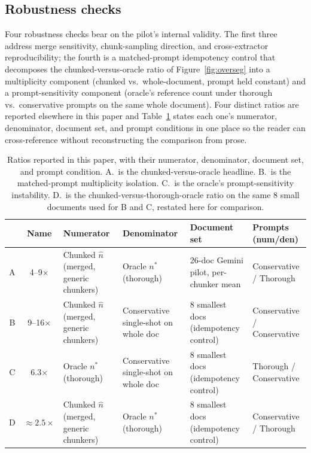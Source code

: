 \documentclass[make,article,submit,oneauthor,pdftex]{Definitions/mdpi}
\begin{document}
\subsection{Robustness checks}\label{sec:robustness}

Four robustness checks bear on the pilot's internal validity. The
first three address merge sensitivity, chunk-sampling direction, and
cross-extractor reproducibility; the fourth is a matched-prompt
idempotency control that decomposes the chunked-versus-oracle ratio
of Figure~\ref{fig:overseg} into a multiplicity component (chunked
vs.\ whole-document, prompt held constant) and a prompt-sensitivity
component (oracle's reference count under thorough vs.\ conservative
prompts on the same whole document). Four distinct ratios are reported
elsewhere in this paper and Table~\ref{tab:ratios} states each one's
numerator, denominator, document set, and prompt conditions in one
place so the reader can cross-reference without reconstructing the
comparison from prose.

\begin{table}[ht]
\centering
\caption{Ratios reported in this paper, with their numerator,
denominator, document set, and prompt condition. A.\ is the
chunked-versus-oracle headline. B.\ is the matched-prompt
multiplicity isolation. C.\ is the oracle's prompt-sensitivity
instability. D.\ is the chunked-versus-thorough-oracle ratio on the
same 8 small documents used for B and C, restated here for
comparison.}
\label{tab:ratios}
\footnotesize
\setlength{\tabcolsep}{4pt}
\begin{tabular}{c c p{2.95cm} p{2.95cm} p{3.3cm} p{2.3cm}}
\toprule
& Name & Numerator & Denominator & Document set & Prompts (num/den) \\
\midrule
A & 4--9$\times$  & Chunked $\hat{n}$ (merged, generic chunkers)
                  & Oracle $n^{*}$ (thorough)
                  & 26-doc Gemini pilot, per-chunker mean
                  & Conservative / Thorough \\
B & 9--16$\times$ & Chunked $\hat{n}$ (merged, generic chunkers)
                  & Conservative single-shot on whole doc
                  & 8 smallest docs (idempotency control)
                  & Conservative / Conservative \\
C & 6.3$\times$   & Oracle $n^{*}$ (thorough)
                  & Conservative single-shot on whole doc
                  & 8 smallest docs (idempotency control)
                  & Thorough / Conservative \\
D & $\approx 2.5\times$ & Chunked $\hat{n}$ (merged, generic chunkers)
                  & Oracle $n^{*}$ (thorough)
                  & 8 smallest docs (idempotency control)
                  & Conservative / Thorough \\
\bottomrule
\end{tabular}
\end{table}
\end{document}
